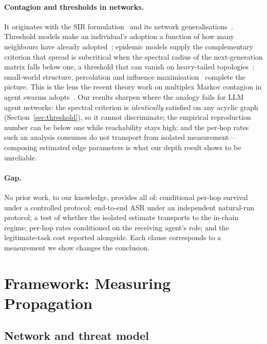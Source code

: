 \documentclass[sigconf,anonymous]{aamas}
\begin{document}
\paragraph{Contagion and thresholds in networks.}
It originates with the SIR formulation~\cite{KermackMcKendrick1927} and its network generalisations~\cite{KeelingEames2005,Newman2002}.
Threshold models make an
individual's adoption a function of how many neighbours have already
adopted~\cite{Granovetter1978,Watts2002}; epidemic models supply the complementary
criterion that spread is subcritical when the spectral radius of the next-generation
matrix falls below one, a threshold that can vanish on heavy-tailed
topologies~\cite{PastorSatorras2001}; small-world structure, percolation and
influence maximisation~\cite{WattsStrogatz1998,Albert2000ErrorTolerance,Kempe2003InfluenceMaximization}
complete the picture. This is the lens the recent theory work on
multiplex Markov contagion in agent swarms adopts~\cite{SwarmMarkov2026}. Our results
sharpen where the analogy fails for LLM agent networks: the spectral criterion is
\emph{identically} satisfied on any acyclic graph (Section~\ref{sec:threshold}), so it
cannot discriminate; the empirical reproduction number can be below one while
reachability stays high; and the per-hop rates such an analysis consumes do not
transport from isolated measurement---composing estimated edge parameters is what
our depth result shows to be unreliable.

\paragraph{Gap.} No prior work, to our knowledge, provides all of: conditional
per-hop survival under a controlled protocol; end-to-end ASR under an independent
natural-run protocol; a test of whether the isolated estimate transports to the
in-chain regime; per-hop rates conditioned on the receiving agent's role; and the
legitimate-task cost reported alongside. Each clause corresponds to a measurement we
show changes the conclusion.


\section{Framework: Measuring Propagation}

\subsection{Network and threat model}
\end{document}
